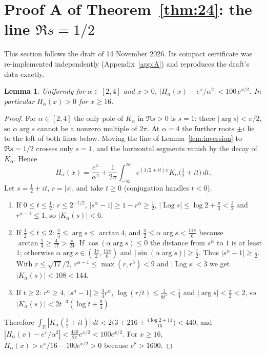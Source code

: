 \documentclass[11pt,a4paper]{article}
\theoremstyle{plain}
\newtheorem{lemma}[theorem]{Lemma}
\theoremstyle{remark}
\newcommand{\R}{\mathbb R}
\DeclareMathOperator{\Log}{Log}
\begin{document}
\section{Proof A of Theorem~\ref{thm:24}: the line \texorpdfstring{$\Re s=1/2$}{Re s = 1/2}}\label{sec:A}
This section follows the draft of 14 November 2026. Its compact certificate was re-implemented
independently (Appendix~\ref{app:A}) and reproduces the draft's data exactly.

\begin{lemma}\label{lem:line}
Uniformly for $\alpha\in[2,4]$ and $x>0$, $\bigl|H_\alpha(x)-e^x/\alpha^2\bigr|<100\,e^{x/2}$.
In particular $H_\alpha(x)>0$ for $x\ge16$.
\end{lemma}
\begin{proof}
For $\alpha\in[2,4]$ the only pole of $K_\alpha$ in $\Re s>0$ is $s=1$: there
$|\arg s|<\pi/2$, so $\alpha\arg s$ cannot be a nonzero multiple of $2\pi$. At $\alpha=4$ the
further roots $\pm i$ lie to the left of both lines below. Moving the line of
Lemma~\ref{lem:inversion} to $\Re s=1/2$ crosses only $s=1$, and the horizontal segments vanish by
the decay of $K_\alpha$. Hence
\[
 H_\alpha(x)=\frac{e^x}{\alpha^2}+\frac1{2\pi}\int_{-\infty}^{\infty}
 e^{(1/2+it)x}K_\alpha\bigl(\tfrac12+it\bigr)\,dt .
\]
Let $s=\frac12+it$, $r=|s|$, and take $t\ge0$ (conjugation handles $t<0$).
\begin{enumerate}
 \item If $0\le t\le\frac12$: $r\le2^{-1/2}$, $|s^\alpha-1|\ge1-r^\alpha\ge\frac12$,
 $|\Log s|\le\log2+\frac\pi4<\frac32$ and $r^{\alpha-1}\le1$, so $|K_\alpha(s)|<6$.
 \item If $\frac12\le t\le2$: $\frac\pi4\le\arg s\le\arctan4$, and
 $\frac\pi2\le\alpha\arg s<\frac{11\pi}6$ because $\arctan\frac14\ge\frac4{17}>\frac\pi{24}$. If
 $\cos(\alpha\arg s)\le0$ the distance from $s^\alpha$ to $1$ is at least $1$; otherwise
 $\alpha\arg s\in(\frac{3\pi}2,\frac{11\pi}6)$ and $|\sin(\alpha\arg s)|\ge\frac12$. Thus
 $|s^\alpha-1|\ge\frac12$. With $r\le\sqrt{17}/2$, $r^{\alpha-1}\le\max(r,r^3)<9$ and
 $|\Log s|<3$ we get $|K_\alpha(s)|<108<144$.
 \item If $t\ge2$: $r^\alpha\ge4$, $|s^\alpha-1|\ge\frac34r^\alpha$, $\log(r/t)\le\frac1{8t^2}<\frac14$
 and $|\arg s|<\frac\pi2<2$, so $|K_\alpha(s)|<2t^{-3}(\log t+\frac94)$.
\end{enumerate}
Therefore
$\int_\R|K_\alpha(\frac12+it)|\,dt<2\bigl(3+216+\frac{4\log2+11}{16}\bigr)<440$, and
$|H_\alpha(x)-e^x/\alpha^2|<\frac{440}{2\pi}e^{x/2}<100e^{x/2}$. For $x\ge16$,
$H_\alpha(x)>e^x/16-100e^{x/2}>0$ because $e^8>1600$.
\end{proof}
\end{document}
